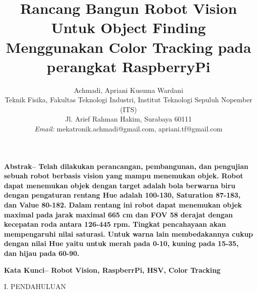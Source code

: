 \documentclass[10pt,journal,compsoc]{IEEEtran}
\begin{document}
 \title{Rancang Bangun Robot Vision Untuk Object Finding Menggunakan Color Tracking pada perangkat RaspberryPi}

 \author{
 Achmadi, Apriani Kusuma Wardani\\
 Teknik Fisika, Fakultas Teknologi Industri, Institut Teknologi Sepuluh Nopember (ITS)\\
 Jl. Arief Rahman Hakim, Surabaya 60111\\
 \textit{Email:} mekatronik.achmadi@gmail.com, apriani.tf@gmail.com
 }
 
 
%   
%   
  
  \maketitle
  
 
 \textbf{
 Abstrak--
 Telah dilakukan perancangan, pembangunan, dan pengujian sebuah robot berbasis vision yang mampu menemukan objek. 
 Robot dapat menemukan objek dengan target adalah bola berwarna biru dengan pengaturan rentang Hue adalah 100-130, Saturation 87-183, dan Value 80-182. 
 Dalam rentang ini robot dapat menemukan objek maximal pada jarak maximal 665 cm dan FOV 58 derajat dengan kecepatan roda antara 126-445 rpm. 
 Tingkat pencahayaan akan mempengaruhi nilai saturasi. Untuk warna lain membedakannya cukup dengan nilai Hue yaitu untuk merah pada 0-10, kuning pada 15-35, dan hijau pada 60-90.
 }
 
 \textbf{
 Kata Kunci--
 Robot Vision,
 RaspberrPi,
 HSV,
 Color Tracking
 }
 
 \begin{center}
     I. PENDAHULUAN
  \end{center}
  
\end{document}
